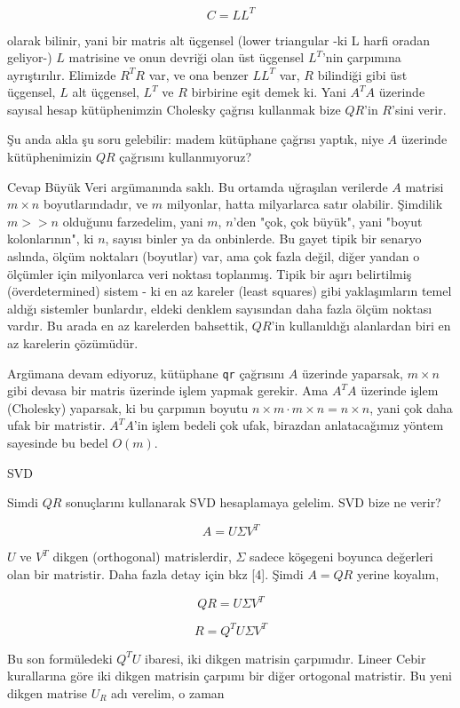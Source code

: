 \documentclass[12pt,fleqn]{article}\usepackage{../../common}
\begin{document}
$$C = LL^T$$

olarak bilinir, yani bir matris alt üçgensel (lower triangular -ki L harfi
oradan geliyor-) $L$ matrisine ve onun devriği olan üst üçgensel $L^T$'nin
çarpımına ayrıştırılır. Elimizde $R^TR$ var, ve ona benzer $LL^T$ var, $R$
bilindiği gibi üst üçgensel, $L$ alt üçgensel, $L^T$ ve $R$ birbirine eşit demek
ki. Yani $A^TA$ üzerinde sayısal hesap kütüphenimzin Cholesky çağrısı kullanmak
bize $QR$'in $R$'sini verir.

Şu anda akla şu soru gelebilir: madem kütüphane çağrısı yaptık, niye $A$
üzerinde kütüphenimizin $QR$ çağrısını kullanmıyoruz?

Cevap Büyük Veri argümanında saklı. Bu ortamda uğraşılan verilerde $A$ matrisi
$m \times n$ boyutlarındadır, ve $m$ milyonlar, hatta milyarlarca satır
olabilir. Şimdilik $m >> n$ olduğunu farzedelim, yani $m$, $n$'den "çok, çok
büyük", yani "boyut kolonlarının", ki $n$, sayısı binler ya da onbinlerde. Bu
gayet tipik bir senaryo aslında, ölçüm noktaları (boyutlar) var, ama çok fazla
değil, diğer yandan o ölçümler için milyonlarca veri noktası toplanmış. Tipik
bir aşırı belirtilmiş (överdetermined) sistem - ki en az kareler (least squares)
gibi yaklaşımların temel aldığı sistemler bunlardır, eldeki denklem sayısından
daha fazla ölçüm noktası vardır. Bu arada en az karelerden bahsettik, $QR$'in
kullanıldığı alanlardan biri en az karelerin çözümüdür.

Argümana devam ediyoruz, kütüphane \verb!qr! çağrısını $A$ üzerinde yaparsak, $m
\times n$ gibi devasa bir matris üzerinde işlem yapmak gerekir. Ama $A^TA$
üzerinde işlem (Cholesky) yaparsak, ki bu çarpımın boyutu $n \times m \cdot m
\times n = n \times n$, yani çok daha ufak bir matristir. $A^TA$'in işlem bedeli
çok ufak, birazdan anlatacağımız yöntem sayesinde bu bedel $O(m)$.

SVD

Simdi $QR$ sonuçlarını kullanarak SVD hesaplamaya gelelim. SVD bize ne verir?

$$ A = U \Sigma V^T $$

$U$ ve $V^T$ dikgen (orthogonal) matrislerdir, $\Sigma$ sadece köşegeni
boyunca değerleri olan bir matristir. Daha fazla detay için bkz [4]. Şimdi
$A = QR$ yerine koyalım,

$$ QR =  U \Sigma V^T $$

$$ R = Q^T U \Sigma V^T $$

Bu son formüledeki $Q^TU$ ibaresi, iki dikgen matrisin çarpımıdır. Lineer Cebir
kurallarına göre iki dikgen matrisin çarpımı bir diğer ortogonal matristir. Bu
yeni dikgen matrise $U_R$ adı verelim, o zaman
\end{document}
